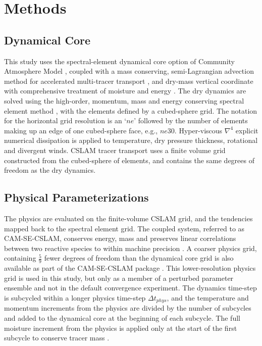 \section{Methods}

\subsection{Dynamical Core}

This study uses the spectral-element dynamical core option of Community Atmosphere Model \citep[CAM-SE;][]{DetAl2012IJHPCA}, coupled with a mass conserving, semi-Lagrangian advection method for accelerated multi-tracer transport \citep[CSLAM;][]{LTOUNGK2017MWR}, and dry-mass vertical coordinate with comprehensive treatment of moisture and energy \citep{LetAl2018JAMES}. The dry dynamics are solved using the high-order, momentum, mass and energy conserving spectral element method \citep{TF2010JCP}, with the elements defined by a cubed-sphere grid. The notation for the horizontal grid resolution is an `$ne$' followed by the number of elements making up an edge of one cubed-sphere face, e.g., $ne30$. Hyper-viscous $\nabla^{4}$ explicit numerical dissipation is applied to temperature, dry pressure thickness, rotational and divergent winds. CSLAM tracer transport uses a finite volume grid constructed from the cubed-sphere of elements, and contains the same degrees of freedom as the dry dynamics.

\subsection{Physical Parameterizations}

The physics are evaluated on the finite-volume CSLAM grid, and the tendencies mapped back to the spectral element grid. The coupled system, referred to as CAM-SE-CSLAM, conserves energy, mass and preserves linear correlations between two reactive species to within machine precision \citep{HL2018MWR}. A coarser physics grid, containing $\frac{5}{9}$ fewer degrees of freedom than the dynamical core grid is also available as part of the CAM-SE-CSLAM package \citep{HETAL2019JAMES}. This lower-resolution physics grid is used in this study, but only as a member of a perturbed parameter ensemble and not in the default convergence experiment. The dynamics time-step is subcycled within a longer physics time-step $\Delta t_{phys}$, and the temperature and momentum increments from the physics are divided by the number of subcycles and added to the dynamical core at the beginning of each subcycle. The full moisture increment from the physics is applied only at the start of the first subcycle to conserve tracer mass \citep[$ftype=2$ option in][]{LetAl2018JAMES}.


